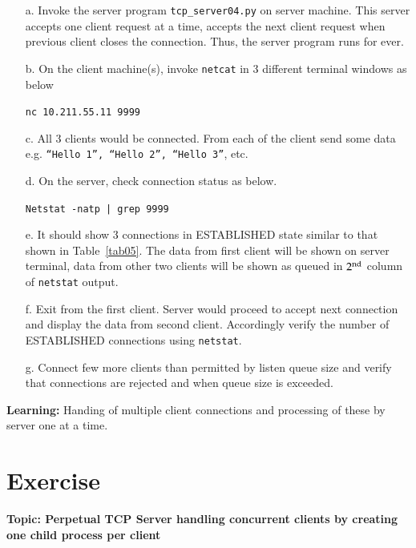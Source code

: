 \begin{multicols}{2}
\begin{itemize}
\item[a.] Invoke the server program \texttt{tcp\_server04.py} on server machine. This server accepts one client request at a time, accepts the next client request when previous client closes the connection. Thus, the server program runs for ever.

\item[b.] On the client machine(s), invoke \texttt{netcat} in 3 different terminal windows as below

\texttt{nc 10.211.55.11 9999}

\item[c.] All 3 clients would be connected. From each of the client send some data e.g. \texttt{“Hello 1”, “Hello 2”, “Hello 3”}, etc.

\item[d.] On the server, check connection status as below.

\texttt{Netstat -natp | grep 9999}

\item[e.] It should show 3 connections in ESTABLISHED state similar to that shown in Table~\ref{tab05}. The data from first client will be shown on server terminal, data from other two clients will be shown as queued in $2^{\rm nd}$ column of \texttt{netstat} output.

\item[f.] Exit from the first client. Server would proceed to accept next connection and display the data from second client. Accordingly verify the number of ESTABLISHED connections using \texttt{netstat}.

\item[g.] Connect few more clients than permitted by listen queue size and verify that connections are rejected and when queue size is exceeded.

\end{itemize}

\textbf{Learning:} Handing of multiple client connections and processing of these by server one at a time.

\section*{Exercise \label{chap1-exe03}}

\textbf{Topic: Perpetual TCP Server handling concurrent clients by creating one child process per client}

\begin{itemize}


\end{itemize}
\end{multicols}
